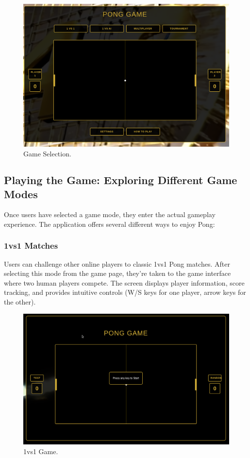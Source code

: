 \begin{figure}[H]
    \centering
    \includegraphics[width=0.7\linewidth]{Figures/images/new_images/GamePage.png}
    \caption{Game Selection.} %
    \label{fig:game-page-journey}
\end{figure}

\subsection{Playing the Game: Exploring Different Game Modes}

Once users have selected a game mode, they enter the actual gameplay experience. The application offers several different ways to enjoy Pong:

\subsubsection{1vs1 Matches} Users can challenge other online players to classic 1vs1 Pong matches. After selecting this mode from the game page, they're taken to the game interface where two human players compete. The screen displays player information, score tracking, and provides intuitive controls (W/S keys for one player, arrow keys for the other).

\begin{figure}[H]
    \centering
    \includegraphics[width=0.65\linewidth]{Figures/images/new_images/Game1vs1.png}
    \caption{1vs1 Game.} %
    \label{fig:game-1vs1-journey}
\end{figure}

